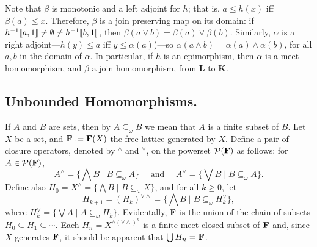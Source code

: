 Note that $\beta$  is monotonic and a left adjoint for $h$; that is, 
$a \leq h(x)$ iff $\beta (a) \leq x$. Therefore, $\beta$ is a join preserving 
map on its domain: 
if $h^{-1}\llbracket a, 1 \rrbracket \neq \emptyset \neq h^{-1}\llbracket b, 1 \rrbracket$, then
$\beta (a \vee b) = \beta (a) \vee \beta (b)$.
Similarly, $\alpha$  is a right adjoint---$h(y) \leq a$ iff
$y \leq \alpha (a)$)---so  $\alpha (a \wedge b) = \alpha (a) \wedge \alpha (b)$, for all 
$a, b$ in the domain of $\alpha$.
In particular, if $h$ is an epimorphism, then $\alpha$ is 
a meet homomorphism, and $\beta$ a join homomorphism, 
from $\mathbf L$ to $\mathbf K$.


\subsection{Unbounded Homomorphisms.}
\newcommand\finsub{\ensuremath{\subseteq_{\omega}}}
If $A$ and $B$ are sets, then by $A \finsub B$ we mean
that $A$ is a finite subset of $B$.
Let $X$ be a set, and $\mathbf{F}:=\mathbf{F}(X)$ the free lattice 
generated by $X$. Define a pair of closure operators, denoted by
$^\wedge$ and $^\vee$, on the powerset $\mathcal P (\mathbf{F})$ as follows: 
for $A\in \mathcal P (\mathbf{F})$, 
\[
A^\wedge = \{\bigwedge B \mid B \finsub A\} \quad \text{ and }\quad
A^\vee = \{\bigvee B \mid B \finsub A\}.
\]
Define also
$H_0 = X^\wedge = \{\bigwedge B \mid B \finsub X\}$, and for all $k\geq 0$, let
\[ H_{k+1} = (H_k)^{\vee \wedge} = \{\bigwedge B \mid B \finsub H_k^{\vee}\}, \]
where $H_k^{\vee} = \{\bigvee A \mid A \finsub H_k\}$.
Evidentally, $\mathbf{F}$ is the union of the chain of subsets 
$H_0\subseteq H_1 \subseteq \cdots$.
Each $H_n = X^{\wedge(\vee\wedge)^n}$ is a finite meet-closed 
subset of $\mathbf{F}$ and, since $X$  generates $\mathbf{F}$, 
it should be apparent that $\bigcup H_n = \mathbf{F}$. 


